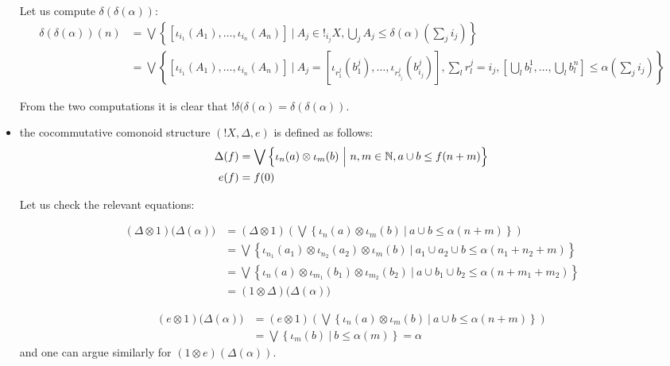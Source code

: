 \begin{itemize}
Let us compute $\delta(\delta(\alpha))$:
{\small
\begin{align*}
\delta(\delta(\alpha))(n) & = 
\bigvee\left \{
[\iota_{i_{1}}(A_{1}),\dots, \iota_{i_{n}}(A_{n})] \ \Bigg \vert \ 
A_{j}\in !_{i_{j}}X, \bigcup_{j}A_{j} \leq \delta(\alpha)(\sum_{j}i_{j})
\right\}\\
&=
\bigvee\left \{
[\iota_{i_{1}}(A_{1}),\dots, \iota_{i_{n}}(A_{n})] \ \Bigg \vert \ 
A_{j}= [\iota_{r_{1}^{j}}(b_{1}^{j}),\dots, \iota_{r_{s_{j}}^{j}}(b_{i_{j}}^{j})], 
\sum_{l} r_{l}^{j} = i_{j}, \left [\bigcup_{l}b_{l}^{1},\dots, \bigcup_{l}b_{l}^{n}\right ]\leq  \alpha(\sum_{j}i_{j})
\right\}
\end{align*}
}

From the two computations it is clear that $!\delta(\delta(\alpha)=\delta(\delta(\alpha))$. 

\item the cocommutative comonoid structure $(!X, \Delta, e)$ is  defined as follows:
\begin{align*}
\Delta(f)& = \bigvee
\left\{ \iota_{n}(a)\otimes \iota_{m}(b) \ \Big \vert \  
n,m\in \mathbb{N}, a\cup b\leq f(n+m)
\right\}\\
e(f)&= f(0)
\end{align*}


Let us check the relevant equations:

\begin{align*}
(\Delta\otimes 1)\Big(\Delta(\alpha)\Big)&=
(\Delta\otimes 1)\left (\bigvee\left \{\iota_{n}(a)\otimes \iota_{m}(b)\ \Big \vert \ a\cup b \leq \alpha(n+m)\right\}\right)\\
&= 
\bigvee\left \{\iota_{n_{1}}(a_{1})\otimes \iota_{n_{2}}(a_{2})\otimes \iota_{m}(b)\ \Big \vert \ a_{1}\cup a_{2}\cup b \leq \alpha(n_{1}+n_{2}+m)\right\}\\
&= 
\bigvee\left \{\iota_{n}(a)\otimes \iota_{m_{1}}(b_{1})\otimes \iota_{m_{2}}(b_{2})\ \Big \vert \ a\cup b_{1}\cup b_{2} \leq \alpha(n+m_{1}+m_{2})\right\}
\\
&= (1\otimes \Delta)\Big(\Delta(\alpha)\Big)
\end{align*}

\begin{align*}
(e\otimes 1)\Big(\Delta(\alpha)\Big) & = 
( e\otimes 1)\left (\bigvee\left \{\iota_{n}(a)\otimes \iota_{m}(b)\ \Big \vert \ a\cup b \leq \alpha(n+m)\right\}\right)\\
&= 
\bigvee\left \{\iota_{m}(b)\ \Big \vert \ b \leq \alpha(m)\right\} =
\alpha
\end{align*}
and one can argue similarly for $(1\otimes e)(\Delta(\alpha))$.


\end{itemize}
